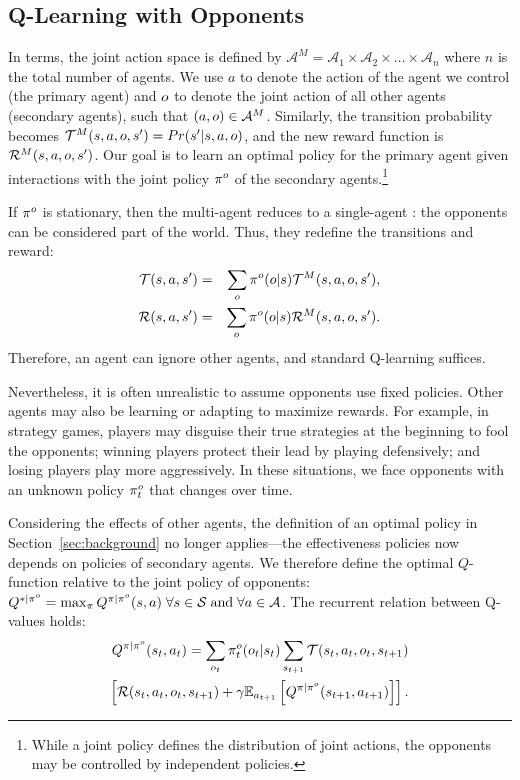 \subsection{Q-Learning with Opponents}

In  terms, the joint action space is defined by $\mathcal{A}^M =
\mathcal{A}_1 \times \mathcal{A}_2 \times \ldots \times \mathcal{A}_n$ where $n$
is the total number of agents.  We use $a$ to denote the action of the agent we
control (the primary agent) and $o$ to denote the joint action of all other agents (secondary agents), such that $(a,
o) \in \mathcal{A}^M$.  Similarly, the transition probability becomes
$\mathcal{T}^M(s,a,o,s')=Pr(s'|s,a,o)$, and the new reward function is
$\mathcal{R}^M(s,a,o,s')$.  Our goal is to learn an optimal policy for the primary
agent given interactions with the joint policy $\pi^o$ of the secondary
agents.\footnote{While a joint policy defines the distribution of joint actions,
  the opponents may be controlled by independent policies.}

If $\pi^o$ is stationary, then the multi-agent  reduces to a single-agent
: the opponents can be considered part of the world.  Thus, they
redefine the transitions and reward:
\begin{eqnarray*}
\mathcal{T}(s,a,s')&=&\sum_{o} \pi^o(o|s) \mathcal{T}^M(s,a,o,s'), \\
\mathcal{R}(s,a,s')&=&\sum_{o} \pi^o(o|s) \mathcal{R}^M(s,a,o,s').
\end{eqnarray*}
Therefore, an agent can ignore other agents,
and standard Q-learning suffices.

Nevertheless, it is often unrealistic to assume opponents use fixed
policies.  Other agents may also be learning or adapting to maximize rewards.
For example, in strategy games, players may disguise their true
strategies at the beginning to fool the opponents; winning players
protect their lead by playing defensively; and losing players play
more aggressively.  In these situations, we face opponents with an unknown
policy $\pi^o_t$ that changes over time.

Considering the effects of other agents, the definition of an optimal policy in
Section~\ref{sec:background} no longer applies---the effectiveness policies now
depends on policies of secondary agents.  We therefore define the optimal
$Q$-function relative to the joint policy of opponents: $Q^{\ast|\pi^o} =
\max_{\pi} Q^{\pi|\pi^o}(s,a) \; \forall s \in \mathcal{S} \;\mbox{and}\; \forall
a \in \mathcal{A}$.  The recurrent relation between Q-values holds:
\begin{eqnarray}
Q^{\pi|\pi^o}(s_t,a_t) = \sum_{o_t} \pi^o_t(o_t|s_t) \sum_{s_{t+1}} \mathcal{T}(s_t,a_t,o_t,s_{t+1}) \nonumber \\
\left[ \mathcal{R}(s_t,a_t,o_t,s_{t+1}) + \gamma\mathbb{E}_{a_{t+1}}\left[ Q^{\pi|\pi^o}(s_{t+1},a_{t+1}) \right] \right] .
\label{eqn:opponent-q}
\end{eqnarray}

